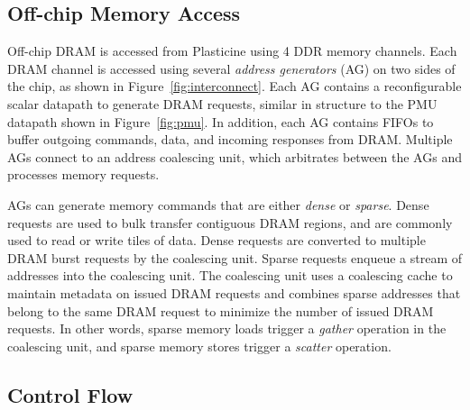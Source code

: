 \subsection{Off-chip Memory Access}
\label{ssec:Off-chip}
Off-chip DRAM is accessed from Plasticine using 4 DDR memory channels.
Each DRAM channel is accessed using several \emph{address generators} (AG) on two sides of the chip, as shown in Figure~\ref{fig:interconnect}.
Each AG contains a reconfigurable scalar datapath to generate DRAM requests, 
similar in structure to the PMU datapath shown in Figure~\ref{fig:pmu}. In addition, each AG contains FIFOs
to buffer outgoing commands, data, and incoming responses from DRAM. Multiple AGs connect to an address coalescing unit,
which arbitrates between the AGs and processes memory requests.

AGs can generate memory commands that are either \emph{dense} or \emph{sparse}. Dense requests are used to bulk transfer
contiguous DRAM regions, and are commonly used to read or write tiles of data. Dense requests are converted
to multiple DRAM burst requests by the coalescing unit. Sparse requests enqueue a stream of addresses into the coalescing
unit. The coalescing unit uses a coalescing cache to maintain metadata on issued DRAM requests and combines sparse
addresses that belong to the same DRAM request to minimize the number of issued DRAM requests. In other words, sparse memory loads trigger
a \emph{gather} operation in the coalescing unit, and sparse memory stores trigger a \emph{scatter} operation.



\subsection{Control Flow}
\label{ssec:Control}


